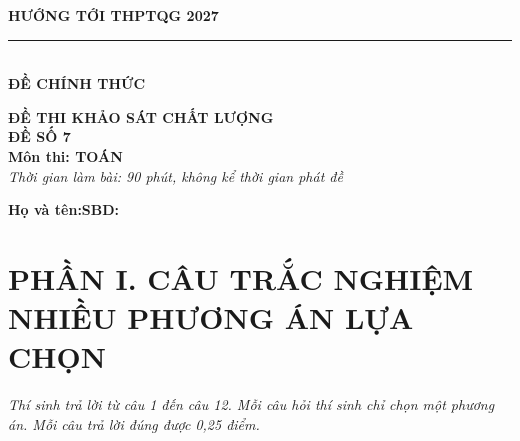 \documentclass[12pt,a4paper]{article}
\begin{document}
\noindent
\begin{minipage}[t]{0.40\textwidth}
    \centering
    \textbf{HƯỚNG TỚI THPTQG 2027}\\[-2pt]
    \rule{3.2cm}{0.6pt}\\[4pt]
    \textbf{ĐỀ CHÍNH THỨC}
\end{minipage}\hfill
\begin{minipage}[t]{0.58\textwidth}
    \centering
    \textbf{ĐỀ THI KHẢO SÁT CHẤT LƯỢNG}\\
    \textbf{ĐỀ SỐ 7}\\
    \textbf{Môn thi: TOÁN}\\
    \textit{\small Thời gian làm bài: 90 phút, không kể thời gian phát đề}
\end{minipage}

\vspace{0.2cm}
\noindent
\begin{minipage}[b]{0.78\textwidth}
    \textbf{Họ và tên:}\dotfill\textbf{SBD:}\makebox[3.5cm]{\dotfill}
\end{minipage}\hfill
\begin{minipage}[b]{0.20\textwidth}
    \hfill
    \setlength{\fboxrule}{0.8pt}%
\end{minipage}
\vspace{0.2cm}

\section*{\large PHẦN I. CÂU TRẮC NGHIỆM NHIỀU PHƯƠNG ÁN LỰA CHỌN}
\textit{Thí sinh trả lời từ câu 1 đến câu 12. Mỗi câu hỏi thí sinh chỉ chọn một phương án. Mỗi câu trả lời đúng được 0,25 điểm.}
\end{document}
